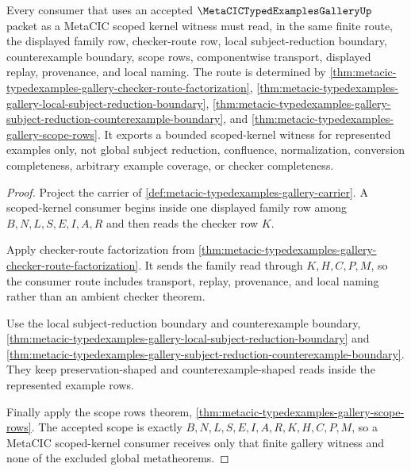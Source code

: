 \begin{theorem}
\label{thm:metacic-typedexamples-gallery-scoped-kernel-consumer-route}
Every consumer that uses an accepted $\MetaCICTypedExamplesGalleryUp$ packet as a MetaCIC scoped kernel witness must read, in the same finite route, the displayed family row, checker-route row, local subject-reduction boundary, counterexample boundary, scope rows, componentwise transport, displayed replay, provenance, and local naming. The route is determined by \autoref{thm:metacic-typedexamples-gallery-checker-route-factorization}, \autoref{thm:metacic-typedexamples-gallery-local-subject-reduction-boundary}, \autoref{thm:metacic-typedexamples-gallery-subject-reduction-counterexample-boundary}, and \autoref{thm:metacic-typedexamples-gallery-scope-rows}. It exports a bounded scoped-kernel witness for represented examples only, not global subject reduction, confluence, normalization, conversion completeness, arbitrary example coverage, or checker completeness.
\end{theorem}
\begin{proof}
Project the carrier of \autoref{def:metacic-typedexamples-gallery-carrier}. A scoped-kernel consumer begins inside one displayed family row among $B,N,L,S,E,I,A,R$ and then reads the checker row $K$.

Apply checker-route factorization from \autoref{thm:metacic-typedexamples-gallery-checker-route-factorization}. It sends the family read through $K,H,C,P,M$, so the consumer route includes transport, replay, provenance, and local naming rather than an ambient checker theorem.

Use the local subject-reduction boundary and counterexample boundary, \autoref{thm:metacic-typedexamples-gallery-local-subject-reduction-boundary} and \autoref{thm:metacic-typedexamples-gallery-subject-reduction-counterexample-boundary}. They keep preservation-shaped and counterexample-shaped reads inside the represented example rows.

Finally apply the scope rows theorem, \autoref{thm:metacic-typedexamples-gallery-scope-rows}. The accepted scope is exactly $B,N,L,S,E,I,A,R,K,H,C,P,M$, so a MetaCIC scoped-kernel consumer receives only that finite gallery witness and none of the excluded global metatheorems.
\end{proof}

